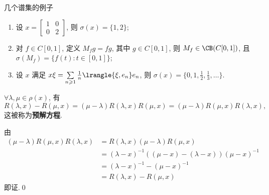 	\begin{Example}
		几个谱集的例子
		\begin{enumerate}[(1)]
			\item 设 $ x = \left[\begin{smallmatrix}
				1 & 0 \\ 0 & 2
			\end{smallmatrix}\right] $, 则 $ \sigma(x)=\{ 1, 2 \} $;
			\item 对 $ f\in C[0, 1] $, 定义 $ M_{f}g =fg $, 其中 $ g\in C[0, 1] $, 则 $ M_{f}\in\CB(C[0, 1]) $, 且 $ \sigma(M_{f})=\{ f(t):t\in [0, 1] \} $;
			\item 设 $ x $ 满足 $ x\xi=\sum\limits_{n\geqslant1}\frac{1}{n}\lrangle{\xi, e_{n}}e_{n} $, 则 $ \sigma(x)=\{ 0, 1, \frac{1}{2}, \frac{1}{3}, \dots \} $.
		\end{enumerate}
	\end{Example}

	\begin{Proposition}
		$ \forall \lambda, \mu\in\rho(x) $, 有
		\[
			R(\lambda, x)-R(\mu, x)=(\mu-\lambda)R(\lambda, x)R(\mu, x) = (\mu-\lambda)R(\mu, x)R(\lambda, x),
		\]
		这被称为\textbf{预解方程}.
	\end{Proposition}
	\begin{Proof}
		由
		\[
			\begin{aligned}
				(\mu-\lambda)R(\mu, x)R(\lambda, x) & = R(\lambda, x)(\mu-\lambda)R(\mu, x)\\
				& = (\lambda-x)^{-1}((\mu-x)-(\lambda-x))(\mu-x)^{-1}\\
				& = (\lambda-x)^{-1}-(\mu-x)^{-1}\\
				& = R(\lambda, x)-R(\mu, x)
			\end{aligned}
		\]
		即证.\qed
	\end{Proof}


